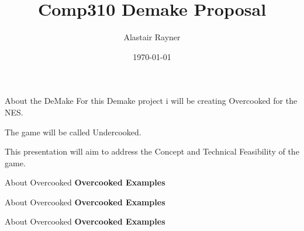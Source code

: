\documentclass{beamer}
\title{Comp310 Demake Proposal}
\author{Alastair Rayner}
\date{\today}
\begin{document}
\maketitle


\begin{frame}{About the DeMake}
	  For this Demake project i will be creating Overcooked for the NES. \pause
	  
	  The game will be called Undercooked.\pause
	  
	 This presentation will aim to address the Concept and Technical Feasibility of the game. \pause
\end{frame}

\begin{frame}{About Overcooked}
    \textbf{Overcooked Examples}
\end{frame}

\begin{frame}{About Overcooked}
    \textbf{Overcooked Examples}
\end{frame}

\begin{frame}{About Overcooked}
    \textbf{Overcooked Examples}
\end{frame}
\end{document}
